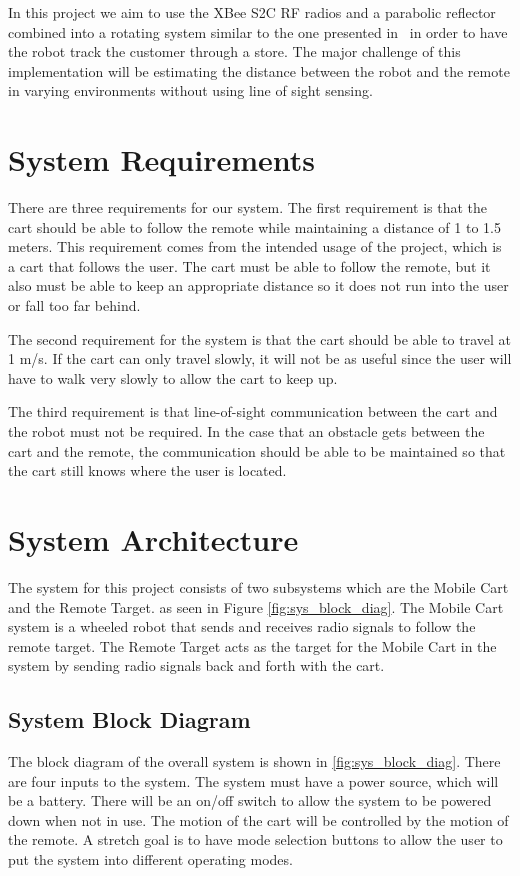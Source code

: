 \documentclass[letterpaper,12pt]{article}   %
\begin{document}
\vspace*{12pt}
\noindent
In this project we aim to use the XBee S2C RF radios and a parabolic reflector combined into a rotating system similar to the one presented in~\cite{Miah2018-Intelligent} in order to have the robot track the customer through a store. The major challenge of this implementation will be estimating the distance between the robot and the remote in varying environments without using line of sight sensing.

\section{System Requirements}
There are three requirements for our system. The first requirement is that the cart should be able to follow the remote while maintaining a distance of 1 to 1.5 meters. This requirement comes from the intended usage of the project, which is a cart that follows the user. The cart must be able to follow the remote, but it also must be able to keep an appropriate distance so it does not run into the user or fall too far behind.

\vspace*{12pt}
\noindent
The second requirement for the system is that the cart should be able to travel at 1 m/s. If the cart can only travel slowly, it will not be as useful since the user will have to walk very slowly to allow the cart to keep up.

\vspace*{12pt}
\noindent
The third requirement is that line-of-sight communication between the cart and the robot must not be required. In the case that an obstacle gets between the cart and the remote, the communication should be able to be maintained so that the cart still knows where the user is located.

\section{System Architecture}
The system for this project consists of two subsystems which are the Mobile Cart and the Remote Target. as seen in Figure \ref{fig:sys_block_diag}. The Mobile Cart system is a wheeled robot that sends and receives radio signals to follow the remote target. The Remote Target acts as the target for the Mobile Cart in the system by sending radio signals back and forth with the cart.

\subsection{System Block Diagram}
The block diagram of the overall system is shown in \autoref{fig:sys_block_diag}. There are four inputs to the system. The system must have a power source, which will be a battery. There will be an on/off switch to allow the system to be powered down when not in use. The motion of the cart will be controlled by the motion of the remote. A stretch goal is to have mode selection buttons to allow the user to put the system into different operating modes.
\end{document}
